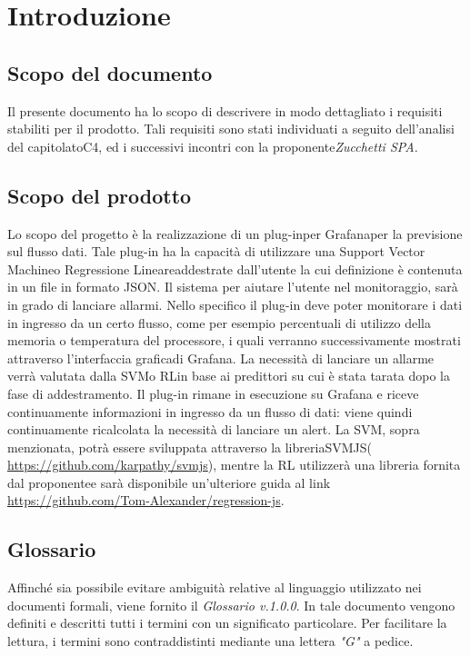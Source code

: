 \section{Introduzione}
	\subsection{Scopo del documento}
		Il presente documento ha lo scopo di descrivere in modo dettagliato i requisiti stabiliti per il prodotto. Tali requisiti sono stati individuati a seguito dell'analisi del capitolato\glo C4, ed i successivi incontri con la proponente\glo \emph{Zucchetti SPA.}

	
\subsection{Scopo del prodotto}
   Lo scopo del progetto è la realizzazione di un plug-in\glo per Grafana\glo per la previsione sul flusso dati\glo. Tale plug-in ha la capacità di utilizzare una Support Vector Machine\glo o Regressione Lineare\glo addestrate dall'utente la cui definizione è contenuta in un file in formato JSON\glo. Il sistema per aiutare l’utente nel monitoraggio, sarà in grado di lanciare allarmi.
Nello specifico il plug-in deve poter monitorare i dati in ingresso da un certo flusso, come per esempio percentuali di utilizzo della memoria o temperatura del processore, i quali verranno successivamente mostrati attraverso l'interfaccia grafica\glo di Grafana.
La necessità di lanciare un allarme verrà valutata dalla SVM\glo o RL\glo in base ai predittori su cui è stata tarata dopo la fase di addestramento.
Il plug-in rimane in esecuzione su Grafana e riceve continuamente informazioni in ingresso da un flusso di dati: viene quindi continuamente ricalcolata la necessità di lanciare un alert\glo.
La SVM, sopra menzionata, potrà essere sviluppata attraverso la libreria\glo SVMJS\glo (\url{ https://github.com/karpathy/svmjs}), mentre la RL utilizzerà una libreria fornita dal proponente\glo e sarà disponibile un’ulteriore guida al link \url{https://github.com/Tom-Alexander/regression-js}.

	
	\subsection{Glossario}
		Affinché sia possibile evitare ambiguità relative al linguaggio utilizzato nei documenti formali, viene fornito il \emph{Glossario v.1.0.0}. In tale documento vengono definiti e descritti tutti i termini con un significato particolare. Per facilitare la lettura, i termini sono contraddistinti mediante una lettera \emph{"G"} a pedice.
		
